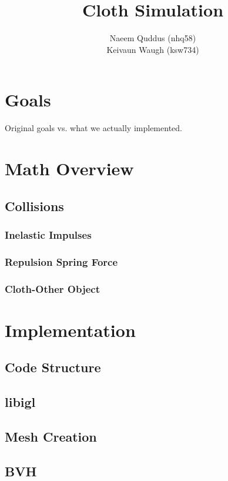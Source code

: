 \documentclass{article}
\begin{document}
\title{Cloth Simulation}
\author{Naeem Quddus (nhq58) \\ Keivaun Waugh (ksw734)}

\maketitle

\section{Goals}
    Original goals vs. what we actually implemented.
\section{Math Overview}
    \subsection{Collisions}
        \subsubsection{Inelastic Impulses}
        \subsubsection{Repulsion Spring Force}
        \subsubsection{Cloth-Other Object}
\section{Implementation}
    \subsection{Code Structure}
    \subsection{libigl}
    \subsection{Mesh Creation}
    \subsection{BVH}
\end{document}
